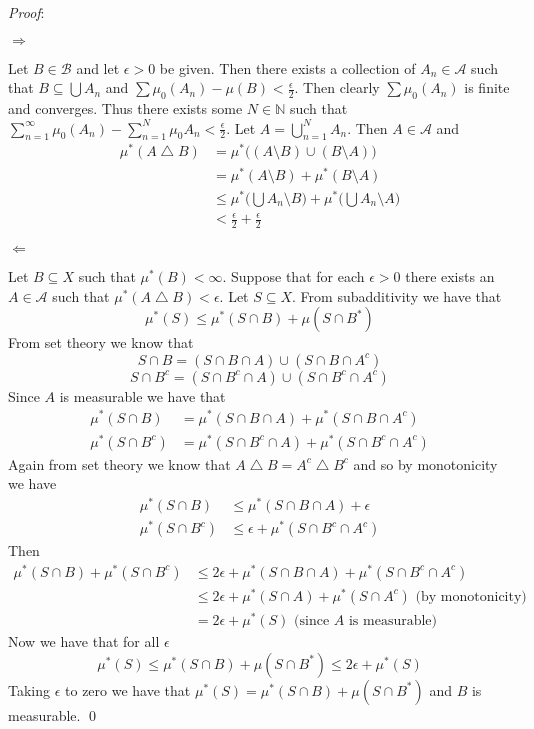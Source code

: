 \documentclass[12pt]{article}
\renewenvironment{proof}{\hspace{-4 ex} \emph{Proof}:}{\qed}
\newcommand{\NN}{\mathbb{N}}
\newcommand{\BB}{\mathcal{B}}
\newcommand{\SA}{\mathcal{A}}
\begin{document}
\begin{proof}
	
	$\Longrightarrow$
	
	Let $B \in \BB$ and let $\epsilon > 0$ be given. Then there exists a collection of $A_n \in \SA$ such that $B \subseteq \bigcup A_n$ and $\sum \mu_0(A_n) - \mu(B) < \tfrac{\epsilon}{2}$. Then clearly $\sum \mu_0(A_n)$ is finite and converges. Thus there exists some $N \in \NN$ such that $\sum\limits_{n=1}^\infty \mu_0(A_n) - \sum\limits_{n=1}^N \mu_0{A_n} < \tfrac{\epsilon}{2}$. Let $A = \bigcup\limits_{n=1}^N A_n$. Then $A \in \SA$ and 
	\begin{align*}
		\mu^*(A \bigtriangleup B) 
		& = \mu^* \big( (A \setminus B) \cup (B \setminus A) \big ) \\
		& = \mu^*(A \setminus B) + \mu^*(B \setminus A) \\
		& \leq  \mu^* \Big( \bigcup A_n \setminus B \Big ) + \mu^* \Big( \bigcup A_n \setminus A \Big ) \\
		& < \tfrac{\epsilon}{2} + \tfrac{\epsilon}{2}
	\end{align*}
	
	$\Longleftarrow$
	
	Let $B \subseteq X$ such that $\mu^*(B) < \infty$. Suppose that for each $\epsilon > 0$ there exists an $A \in \SA$ such that $\mu^*(A \bigtriangleup B) < \epsilon$. Let $S \subseteq X$. From subadditivity we have that 
	$$
	\mu^*(S) \leq \mu^*(S \cap B) + \mu(S \cap B^*)
	$$
	From set theory we know that
	$$
	S \cap B = (S \cap B \cap A) \cup (S \cap B \cap A^c)
	$$$$
	S \cap B^c = (S \cap B^c \cap A) \cup (S \cap B^c \cap A^c)
	$$
	Since $A$ is measurable we have that 
	\begin{align*}
		\mu^*(S \cap B) & = \mu^*(S \cap B \cap A) + \mu^*(S \cap B \cap A^c) \\
		\mu^*(S \cap B^c) & = \mu^*(S \cap B^c \cap A) + \mu^*(S \cap B^c \cap A^c)
	\end{align*}
	Again from set theory we know that $A \bigtriangleup B = A^c \bigtriangleup B^c$ and so by monotonicity we have
	\begin{align*}
		\mu^*(S \cap B) & \leq \mu^*(S \cap B \cap A) + \epsilon \\
		\mu^*(S \cap B^c) & \leq \epsilon + \mu^*(S \cap B^c \cap A^c)
	\end{align*}
	Then
	\begin{align*}
		\mu^*(S \cap B) + \mu^*(S \cap B^c) & \leq 2\epsilon + \mu^*(S \cap B \cap A) + \mu^*(S \cap B^c \cap A^c) \\
		& \leq 2\epsilon + \mu^*(S \cap A) + \mu^*(S \cap A^c) \text{    (by monotonicity)} \\
		& = 2\epsilon + \mu^*(S) \text{ (since $A$ is measurable)}
	\end{align*}
	Now we have that for all $\epsilon$
	$$
	\mu^*(S) \leq \mu^*(S \cap B) + \mu(S \cap B^*) \leq 2\epsilon + \mu^*(S)
	$$
	Taking $\epsilon$ to zero we have that $\mu^*(S) = \mu^*(S \cap B) + \mu(S \cap B^*)$ and $B$ is measurable.	
\end{proof}
\end{document}
